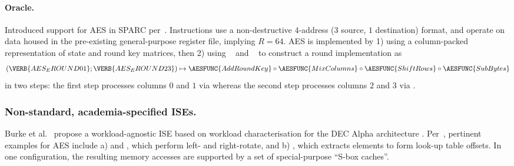 \paragraph{Oracle.}
      Introduced support for AES in 
      SPARC 
      per~\cite[Sections 7.3+7.4]{SPARC:16}.
      Instructions use a
      non-destructive $4$-address ($3$ source, $1$        destination)
      format,
      and operate on data housed in the pre-existing
      general-purpose
      register file, implying $R =  64$.
      AES is implemented by
      1) using a 
         column-packed
         representation of state and round key matrices,
         then
      2) using
                  ~\cite[Page 109]{SPARC:16}
             and
                  ~\cite[Page 109]{SPARC:16}
         to construct a round implementation as
         \[
         ( \VERB{AES_EROUND01};\VERB{AES_EROUND23} ) \mapsto \AESFUNC{AddRoundKey} \circ \AESFUNC{MixColumns} \circ \AESFUNC{ShiftRows} \circ \AESFUNC{SubBytes} 
         \]
         in two steps:
         the first  step processes columns $0$ and $1$ via 
         whereas
         the second step processes columns $2$ and $3$ via .


\subsubsection{Non-standard, academia-specified ISEs.}


      Burke et al.~\cite{BurMcDAus:00}
      propose 
      a workload-agnostic ISE
      based on workload characterisation for the
      DEC Alpha architecture \cite{alpha2014alpha}.
      Per~\cite{BurMcDAus:00}, pertinent examples
      for AES
      include
      a) 
         and
         ,
         which perform
         left- and right-rotate,
         and
      b) ,
         which 
         extracts elements to form look-up table offsets.
         In one configuration,
         the resulting memory accesses are supported by a
         set of special-purpose ``S-box caches''.

